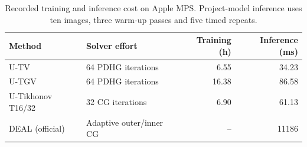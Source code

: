 \begin{table}[htbp]
\centering
\caption{Recorded training and inference cost on Apple MPS. Project-model inference uses ten images, three warm-up passes and five timed repeats.}
\label{tab:computational_cost}
\begin{tabular}{llrr}
\toprule
Method & Solver effort & Training (h) & Inference (ms) \\
\midrule
U-TV & 64 PDHG iterations & 6.55 & 34.23 \\
U-TGV & 64 PDHG iterations & 16.38 & 86.58 \\
U-Tikhonov T16/32 & 32 CG iterations & 6.90 & 61.13 \\
DEAL (official) & Adaptive outer/inner CG & -- & 11186 \\
\bottomrule
\end{tabular}
\end{table}
